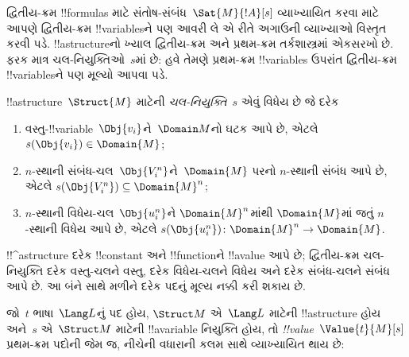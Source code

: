 \documentclass[../../../include/open-logic-section]{subfiles}
\begin{document}


\begin{explain}
દ્વિતીય-ક્રમ !!{formula}s માટે સંતોષ-સંબંધ~$\Sat{M}{!A}[s]$
વ્યાખ્યાયિત કરવા માટે આપણે દ્વિતીય-ક્રમ !!{variable}sને પણ આવરી લે
એ રીતે અગાઉની વ્યાખ્યાઓ વિસ્તૃત કરવી પડે. !!a{structure}નો ખ્યાલ
દ્વિતીય-ક્રમ અને પ્રથમ-ક્રમ તર્કશાસ્ત્રમાં એકસરખો છે. ફરક માત્ર
ચલ-નિયુક્તિઓ~$s$માં છે: હવે તેમણે પ્રથમ-ક્રમ !!{variable}s ઉપરાંત
દ્વિતીય-ક્રમ !!{variable}sને પણ મૂલ્યો આપવા પડે.
\end{explain}

\begin{defn}[ચલ-નિયુક્તિ]
!!a{structure}~$\Struct{M}$ માટેની \emph{ચલ-નિયુક્તિ}~$s$ એવું
વિધેય છે જે દરેક
\begin{enumerate}
\item વસ્તુ-!!{variable}~$\Obj{v_i}$ને~$\Domain M$નો ઘટક આપે છે,
  એટલે $s(\Obj{v_i}) \in \Domain{M}$;
\item $n$-સ્થાની સંબંધ-ચલ~$\Obj{V_i^n}$ને~$\Domain{M}$ પરનો
  $n$-સ્થાની સંબંધ આપે છે, એટલે
  $s(\Obj{V_i^n}) \subseteq \Domain{M}^n$;
\item $n$-સ્થાની વિધેય-ચલ~$\Obj{u_i^n}$ને $\Domain{M}^n$માંથી
  $\Domain{M}$માં જતું $n$-સ્થાની વિધેય આપે છે, એટલે
  $s(\Obj{u_i^n})\colon \Domain{M}^n \to \Domain{M}$.
\end{enumerate}
\end{defn}

\begin{explain}
!!^a{structure} દરેક !!{constant} અને !!{function}ને !!a{value}
આપે છે; દ્વિતીય-ક્રમ ચલ-નિયુક્તિ દરેક વસ્તુ-ચલને વસ્તુ, દરેક
વિધેય-ચલને વિધેય અને દરેક સંબંધ-ચલને સંબંધ આપે છે. આ બંને સાથે
મળીને દરેક પદનું મૂલ્ય નક્કી કરી શકાય છે.
\end{explain}

\begin{defn}
જો~$t$ ભાષા~$\Lang L$નું પદ હોય, $\Struct M$ એ~$\Lang L$ માટેની
!!a{structure} હોય અને~$s$ એ~$\Struct M$ માટેની !!a{variable}
નિયુક્તિ હોય, તો \emph{!!{value}}~$\Value{t}{M}[s]$ પ્રથમ-ક્રમ
પદોની જેમ જ, નીચેની વધારાની કલમ સાથે વ્યાખ્યાયિત થાય છે:
\begin{quote}
\end{quote}
\end{defn}
\end{document}
